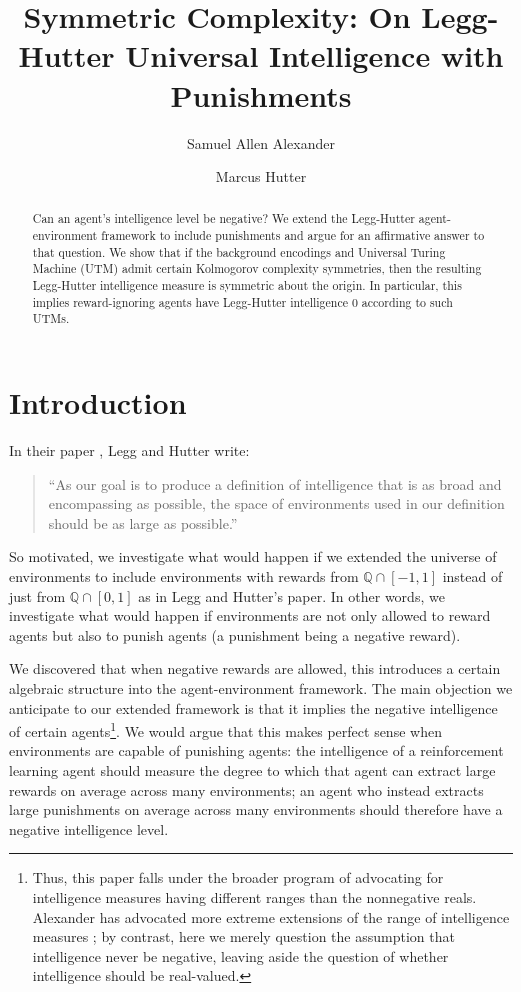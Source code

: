 \documentclass[runningheads]{llncs}
\title{Symmetric Complexity: On Legg-Hutter Universal Intelligence with Punishments}
\author{Samuel Allen Alexander\inst{1}\orcidID{0000-0002-7930-110X}
\and
Marcus Hutter\inst{2}\orcidID{0000-0002-3263-4097}}
\institute{The U.S.\ Securities and Exchange Commission
\email{samuelallenalexander@gmail.com}
\url{https://philpeople.org/profiles/samuel-alexander/publications}
\and
Google DeepMind
\email{marcus.hutter@anu.edu.au}
\url{http://www.hutter1.net/}
}
\begin{document}
\maketitle

\begin{abstract}
    Can an agent's intelligence level be negative?
    We extend the Legg-Hutter agent-environment framework to include punishments
    and argue for an affirmative answer to that question.
    We show that if the background encodings and Universal Turing Machine (UTM) admit
    certain Kolmogorov complexity symmetries,
    then the resulting Legg-Hutter intelligence measure is symmetric about
    the origin. In particular, this implies reward-ignoring agents
    have Legg-Hutter intelligence $0$ according to such UTMs.
\end{abstract}

\section{Introduction}

In their paper \cite{legg2007universal}, Legg and Hutter write:
\begin{quote}
    ``As our goal is to produce a definition of intelligence that is as broad and
    encompassing as possible, the space of environments used in our definition should
    be as large as possible.''
\end{quote}
So motivated, we investigate what would happen if we extended the universe
of environments to include environments with rewards from $\mathbb Q\cap [-1,1]$
instead of just from $\mathbb Q\cap [0,1]$ as in Legg and Hutter's paper.
In other words, we investigate what would happen if environments are not only
allowed to reward agents but also to punish agents (a punishment being a negative
reward).

We discovered that when negative rewards are allowed, this
introduces a certain algebraic structure into the agent-environment framework. The
main objection we anticipate to our extended framework
is that it implies the negative intelligence of certain
agents\footnote{Thus, this paper falls under the broader
program of advocating for intelligence measures having different ranges than
the nonnegative reals. Alexander has advocated
more extreme extensions of the range of intelligence measures
\cite{alexander2020archimedean} \cite{alexander2021measuring}; by contrast,
here we merely question the
assumption that intelligence never be negative, leaving aside the
question of whether intelligence should be real-valued.}.
We would argue that this makes perfect sense when environments are capable of punishing
agents: the intelligence of a reinforcement learning agent should measure the
degree to which that agent can extract large rewards on average across many environments;
an agent who instead extracts large punishments on average across many environments
should therefore have a negative intelligence level.
\end{document}
